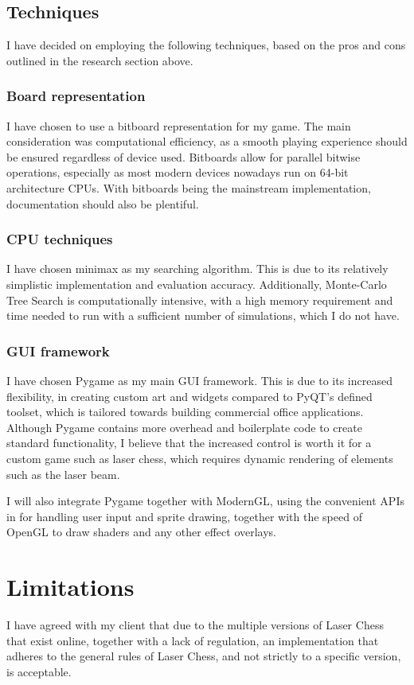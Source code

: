 \documentclass[../main/main.tex]{subfiles}
\begin{document}
\subsection{Techniques}
I have decided on employing the following techniques, based on the pros and cons outlined in the research section above.

\subsubsection*{Board representation}
I have chosen to use a bitboard representation for my game. The main consideration was computational efficiency, as a smooth playing experience should be ensured regardless of device used. Bitboards allow for parallel bitwise operations, especially as most modern devices nowadays run on 64-bit architecture CPUs. With bitboards being the mainstream implementation, documentation should also be plentiful.

\subsubsection*{CPU techniques}
I have chosen minimax as my searching algorithm. This is due to its relatively simplistic implementation and evaluation accuracy. Additionally, Monte-Carlo Tree Search is computationally intensive, with a high memory requirement and time needed to run with a sufficient number of simulations, which I do not have. 

\subsubsection*{GUI framework}
I have chosen Pygame as my main GUI framework. This is due to its increased flexibility, in creating custom art and widgets compared to PyQT’s defined toolset, which is tailored towards building commercial office applications. Although Pygame contains more overhead and boilerplate code to create standard functionality, I believe that the increased control is worth it for a custom game such as laser chess, which requires dynamic rendering of elements such as the laser beam.

I will also integrate Pygame together with ModernGL, using the convenient APIs in for handling user input and sprite drawing, together with the speed of OpenGL to draw shaders and any other effect overlays.

\section{Limitations}
I have agreed with my client that due to the multiple versions of Laser Chess that exist online, together with a lack of regulation, an implementation that adheres to the general rules of Laser Chess, and not strictly to a specific version, is acceptable.
\end{document}
